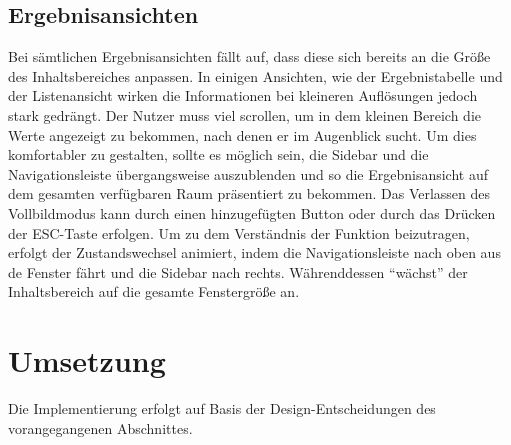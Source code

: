 \subsection{Ergebnisansichten}
Bei sämtlichen Ergebnisansichten fällt auf, dass diese sich bereits an die Größe des Inhaltsbereiches anpassen. In einigen Ansichten, wie der Ergebnistabelle und der Listenansicht wirken die Informationen bei kleineren Auflösungen jedoch stark gedrängt. Der Nutzer muss viel scrollen, um in dem kleinen Bereich die Werte angezeigt zu bekommen, nach denen er im Augenblick sucht. Um dies komfortabler zu gestalten, sollte es möglich sein, die Sidebar und die Navigationsleiste übergangsweise auszublenden und so die Ergebnisansicht auf dem gesamten verfügbaren Raum präsentiert zu bekommen. Das Verlassen des Vollbildmodus kann durch einen hinzugefügten Button oder durch das Drücken der ESC-Taste erfolgen. Um zu dem Verständnis der Funktion beizutragen, erfolgt der Zustandswechsel animiert, indem die Navigationsleiste nach oben aus de Fenster fährt und die Sidebar nach rechts. Währenddessen \enquote{wächst} der Inhaltsbereich auf die gesamte Fenstergröße an.\par
\section{Umsetzung} \label{sec:responsiveImplementation}
Die Implementierung erfolgt auf Basis der Design-Entscheidungen des vorangegangenen Abschnittes.\par
